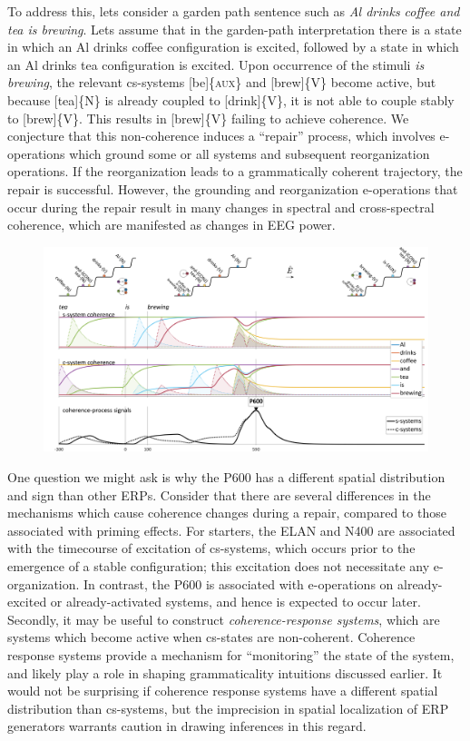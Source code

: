   To address this, lets consider a garden path sentence such as \textit{Al drinks coffee and tea is brewing}. Lets assume that in the garden-path interpretation there is a state in which an {\textbar}Al drinks coffee{\textbar} configuration is excited, followed by a state in which an {\textbar}Al drinks tea{\textbar} configuration is excited. Upon occurrence of the stimuli \textit{is brewing}, the relevant cs-systems [be]\{\textsc{aux}\} and [brew]\{V\} become active, but because [tea]\{N\} is already coupled to [drink]\{V\}, it is not able to couple stably to [brew]\{V\}. This results in [brew]\{V\} failing to achieve coherence. We conjecture that this non-coherence induces a “repair” process, which involves e-operations which ground some or all systems and subsequent reorganization operations. If the reorganization leads to a grammatically coherent trajectory, the repair is successful. However, the grounding and reorganization e-operations that occur during the repair result in many changes in spectral and cross-spectral coherence, which are manifested as changes in EEG power. 

  
\begin{figure}
\includegraphics[width=\textwidth]{figures/Tilsen-img144.png}
\caption{\missingcaption}
\label{fig:}
\end{figure}
 

One question we might ask is why the P600 has a different spatial distribution and sign than other ERPs. Consider that there are several differences in the mechanisms which cause coherence changes during a repair, compared to those associated with priming effects. For starters, the ELAN and N400 are associated with the timecourse of excitation of cs-systems, which occurs prior to the emergence of a stable configuration; this excitation does not necessitate any e-organization. In contrast, the P600 is associated with e-operations on already-excited or already-activated systems, and hence is expected to occur later. Secondly, it may be useful to construct \textit{coherence-response systems}, which are systems which become active when cs-states are non-coherent. Coherence response systems provide a mechanism for “monitoring” the state of the system, and likely play a role in shaping grammaticality intuitions discussed earlier. It would not be surprising if coherence response systems have a different spatial distribution than cs-systems, but the imprecision in spatial localization of ERP generators warrants caution in drawing inferences in this regard.

